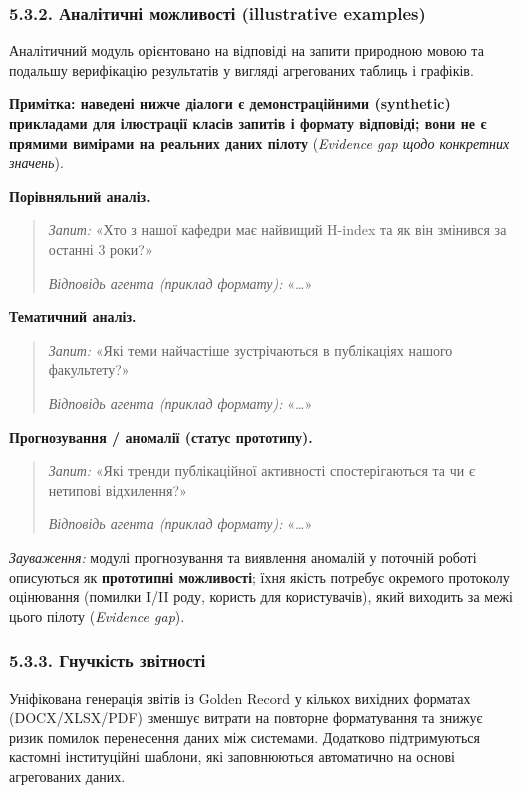 \subsubsection*{5.3.2. Аналітичні можливості (illustrative examples)}

Аналітичний модуль орієнтовано на відповіді на запити природною мовою та подальшу верифікацію результатів у вигляді агрегованих таблиць і графіків.

\textbf{Примітка: наведені нижче діалоги є демонстраційними (synthetic) прикладами для ілюстрації класів запитів і формату відповіді; вони не є прямими вимірами на реальних даних пілоту} (\textit{Evidence gap щодо конкретних значень}).

\textbf{Порівняльний аналіз.}
\begin{quote}
\textit{Запит:} «Хто з нашої кафедри має найвищий H-index та як він змінився за останні 3 роки?»

\textit{Відповідь агента (приклад формату):} «…»
\end{quote}

\textbf{Тематичний аналіз.}
\begin{quote}
\textit{Запит:} «Які теми найчастіше зустрічаються в публікаціях нашого факультету?»

\textit{Відповідь агента (приклад формату):} «…»
\end{quote}

\textbf{Прогнозування / аномалії (статус прототипу).}
\begin{quote}
\textit{Запит:} «Які тренди публікаційної активності спостерігаються та чи є нетипові відхилення?»

\textit{Відповідь агента (приклад формату):} «…»
\end{quote}

\textit{Зауваження:} модулі прогнозування та виявлення аномалій у поточній роботі описуються як \textbf{прототипні можливості}; їхня якість потребує окремого протоколу оцінювання (помилки I/II роду, користь для користувачів), який виходить за межі цього пілоту (\textit{Evidence gap}).

\subsubsection*{5.3.3. Гнучкість звітності}

Уніфікована генерація звітів із Golden Record у кількох вихідних форматах (DOCX/XLSX/PDF) зменшує витрати на повторне форматування та знижує ризик помилок перенесення даних між системами. Додатково підтримуються кастомні інституційні шаблони, які заповнюються автоматично на основі агрегованих даних.

